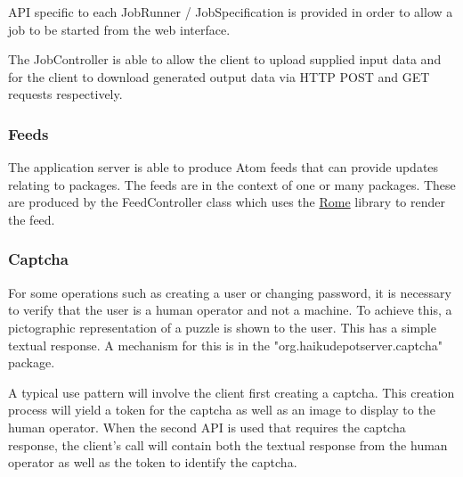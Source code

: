 API specific to each JobRunner / JobSpecification is provided in order to allow a job to be started from the web interface.

The JobController is able to allow the client to upload supplied input data and for the client to download generated output data via HTTP POST and GET requests respectively.

\subsubsection{Feeds}

The application server is able to produce Atom feeds that can provide updates relating to packages.  The feeds are in the context of one or many packages.  These are produced by the FeedController class which uses the \href{http://rometools.github.io/rome/}{Rome} library to render the feed.

\subsubsection{Captcha}

For some operations such as creating a user or changing password, it is necessary to verify that the user is a human operator and not a machine.  To achieve this, a pictographic representation of a puzzle is shown to the user.  This has a simple textual response.  A mechanism for this is in the "org.haikudepotserver.captcha" package.

A typical use pattern will involve the client first creating a captcha.  This creation process will yield a token for the captcha as well as an image to display to the human operator.  When the second API is used that requires the captcha response, the client's call will contain both the textual response from the human operator as well as the token to identify the captcha.
